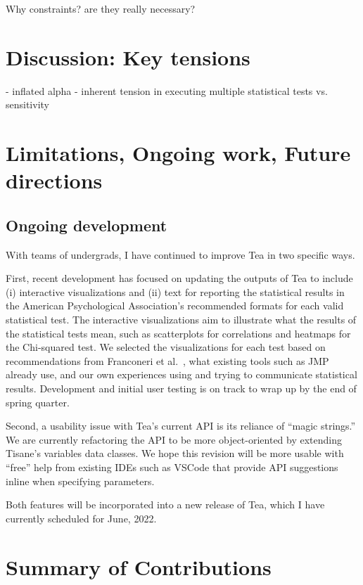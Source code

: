 

Why constraints? are they really necessary?



\section{Discussion: Key tensions}
- inflated alpha
- inherent tension in executing multiple statistical tests vs. sensitivity

\section{Limitations, Ongoing work, Future directions}

\subsection{Ongoing development}
With teams of undergrads, I have continued to improve Tea in two specific ways. 

First, recent development has focused on updating the outputs of Tea to include
(i) interactive visualizations and (ii) text for reporting the statistical
results in the American Psychological Association's recommended formats for each
valid statistical test. The interactive visualizations aim to illustrate what
the results of the statistical tests mean, such as scatterplots for correlations
and heatmaps for the Chi-squared test. We selected the visualizations for each
test based on recommendations from Franconeri et
al.~\cite{franconeriVisualizationChooser}, what existing tools such as
JMP~\cite{jmp} already use, and our own experiences using and trying to
communicate statistical results. Development and initial user testing is on
track to wrap up by the end of spring quarter. 

Second, a usability issue with Tea's current API is its reliance of ``magic
strings.'' We are currently refactoring the API to be more object-oriented by
extending Tisane's variables data classes. We hope this revision will be more
usable with ``free'' help from existing IDEs such as VSCode that provide API
suggestions inline when specifying parameters. 

Both features will be incorporated into a new release of Tea, which I have
currently scheduled for June, 2022. 

\section{Summary of Contributions}
